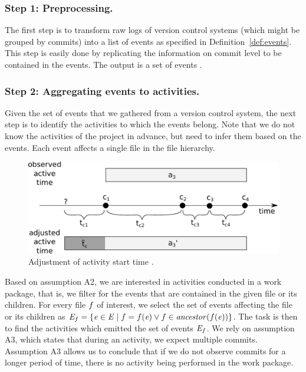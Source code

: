 \subsubsection{Step 1: Preprocessing.} The first step is to transform raw logs of version control systems (which might be grouped by commits) into a list of events as specified in Definition~\ref{def:events}. This step is easily done by replicating the information on commit level to be contained in the events. The output is a set of events \Events.

\subsubsection{Step 2: Aggregating events to activities.}
Given the set of events \Events that we gathered from a version control system, the next step is to identify the activities to which the events belong. Note that we do not know the activities of the project in advance, but need to infer them based on the events. Each event affects a single file in the file hierarchy.

\begin{figure}
\centering
\includegraphics[width=.7\textwidth]{bpm2015/imgs/activity_adjustment.pdf}
\caption{Adjustment of activity start time \startTimeFunction. }
\label{fig:bpm2015:activity_adjustment}
\end{figure}

Based on assumption A2, we are interested in activities conducted in a work package, that is, we filter for the events that are contained in the given file or its children. For every file $f$ of interest, we select the set of events affecting the file or its children as $\mathit{E}_{f} = \lbrace \mathit{e} \in \mathit{E} \mid f = f(\mathit{e}) \vee f \in \mathit{ancestor}(f(\mathit{e}))  \rbrace$. The task is then to find the activities which emitted the set of events $\mathit{E}_{f}$. We rely on assumption A3, which states that during an activity, we expect multiple commits. Assumption A3 allows us to conclude that if we do not observe commits for a longer period of time, there is no activity being performed in the work package.

